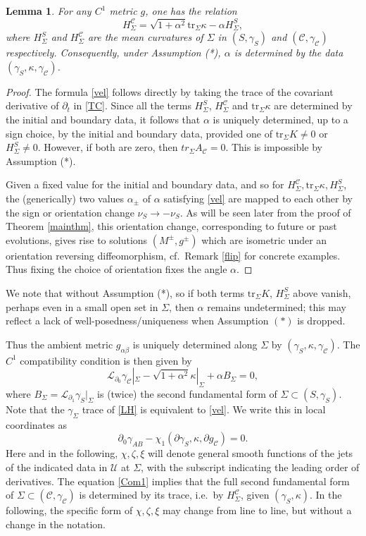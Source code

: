 \documentclass[10pt]{amsart}
\renewcommand{\a}{\alpha}
\renewcommand{\b}{\beta}
\newcommand{\g}{\gamma}
\newcommand{\Si}{\Sigma}
\renewcommand{\k}{\kappa}
\newcommand{\cC}{{\mathcal C}}
\newcommand{\cL}{{\mathcal L}}
\newcommand{\cU}{{\mathcal U}}
\newcommand{\be}{\begin{equation}}
\newcommand{\ee}{\end{equation}}
\newcommand{\tr}{\mathrm{tr}}
\newcommand{\p}{\partial}
\renewcommand{\to}{\rightarrow}
\newcommand{\<}{\langle}
\renewcommand{\>}{\rangle}
\theoremstyle{plain}
\newtheorem{lemma}{Lemma}[section]
\theoremstyle{remark}
\theoremstyle{definition}
\numberwithin{equation}{section}
\begin{document}
\begin{lemma}\label{alpha}
For any $C^1$ metric $g$, one has the relation 
\be \label{vel}
H_{\Si}^{\cC} = \sqrt{1+\a^2}\tr_\Si \k - \a H_\Si^S,
\ee
where $H_{\Si}^S$ and $H_{\Si}^{\cC}$ are the mean curvatures of $\Si$ in $(S, \g_S)$ and $(\cC, \g_{\cC})$ respectively. 
Consequently, under Assumption (*), $\a$ is determined by the data $(\g_S, \k, \g_{\cC})$. 
\end{lemma}

\begin{proof}
The formula \eqref{vel} follows directly by taking the trace of the covariant derivative of $\p_t$ in \eqref{TC}. 
Since all the terms $H_{\Si}^S$, $H_{\Si}^{\cC}$ and $\tr_{\Si} \k$ are determined by the initial and boundary data, it follows 
that $\a$ is uniquely determined, up to a sign choice, by the initial and boundary data, provided one of $\tr_{\Si}K \neq 0$ or $H_{\Si}^S \neq 0$. 
However, if both are zero, then $tr_{\Si}A_{\cC} = 0$. This is impossible by Assumption (*). 

Given a fixed value for the initial and boundary data, and so for $H_{\Si}^{\cC}, \tr_{\Si}\k, H_{\Si}^S$, the (generically) two values $\a_{\pm}$ of $\a$ 
satisfying \eqref{vel} are mapped to each other by the sign or orientation change $\nu_S \to -\nu_S$. As will be seen later from the proof of 
Theorem \ref{mainthm}, this orientation change, corresponding to future or past evolutions, gives rise to solutions $(M^{\pm}, g^{\pm})$ which 
are isometric under an orientation reversing diffeomorphism, cf.~Remark \ref{flip} for concrete examples. Thus fixing the choice of orientation 
fixes the angle $\a$. 

\end{proof} 

 We note that without Assumption (*), so if both terms $\tr_{\Si}K$, $H_{\Si}^S$ above vanish, perhaps even in a small open set in $\Si$, 
then $\a$ remains undetermined; this may reflect a lack of well-posedness/uniqueness when Assumption $(*)$ is dropped.  



Thus the ambient metric $g_{\a\b}$ is uniquely determined along $\Si$ by $(\g_S, \k, \g_{\cC})$. The $C^1$ compatibility condition is then given by 
\be \label{LH}
\cL_{\p_0}\g_{\cC} |_{\Si}  - \sqrt{1+\a^2}\k |_{\Si}  + \a B_{\Si} = 0,
\ee
where $B_{\Si} = \cL_{\p_1}\g_S |_{\Si}$ is (twice) the second fundamental form of $\Si \subset (S, \g_S)$. Note that the $\g_{\Si}$ trace of 
\eqref{LH} is equivalent to \eqref{vel}. We write this in local coordinates as 
\be \label{Com1}
\p_0 \g_{AB} - \chi_1(\p \g_S, \k, \p g_\cC) = 0.
\ee
Here and in the following, $\chi, \zeta, \xi$ will denote general smooth functions of the jets of the indicated data in $\cU$ at $\Si$, with the subscript indicating 
the leading order of derivatives. The equation \eqref{Com1} implies that the full second fundamental form of $\Si \subset (\cC, \g_{\cC})$ is determined by its 
trace, i.e.~by $H_{\Si}^{\cC}$, given $(\g_S, \k)$. In the following, the specific form of $\chi, \zeta, \xi$ may change from line to line, but without a change in the notation. 
\end{document}
